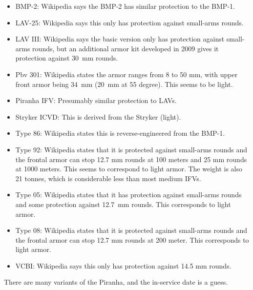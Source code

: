 \begin{withcounters}
{\begin{itemize}
            \item BMP-2: Wikipedia says the BMP-2 has similar protection to the BMP-1.
            \item LAV-25: Wikipedia says this only has protection against small-arms rounds.
            \item LAV III: Wikipedia says the basic version only has protection against small-arms rounds, but an additional armor kit developed in 2009 gives it protection against 30~mm rounds.
            \item Pbv 301: Wikipedia states the armor ranges from 8 to 50 mm, with upper front armor being 34~mm (20~mm at 55 degree). This seems to be light.
            \item Piranha IFV: Presumably similar protection to LAVs.
            \item Stryker ICVD: This is derived from the Stryker (light).
            \item Type 86: Wikipedia states this is reverse-engineered from the BMP-1.
            \item Type 92: Wikipedia states that it is protected against small-arms rounds and the frontal armor can stop 12.7 mm rounds at 100 meters and 25 mm rounds at 1000 meters. This seems to correspond to light armor. The weight is also 21 tonnes, which is considerable less than most medium IFVs.
            \item Type 05: Wikipedia states that it has protection against small-arms rounds and some protection against 12.7~mm rounds. This corresponds to light armor.
            \item Type 08: Wikipedia states that it is protected against small-arms rounds and the frontal armor can stop 12.7 mm rounds at 200 meter. This corresponds to light armor.
            \item VCBI: Wikipedia says this only has protection against 14.5 mm rounds.
        \end{itemize}

        There are many variants of the Piranha, and the in-service date is a guess.
    }\\
    \\



\end{withcounters}

